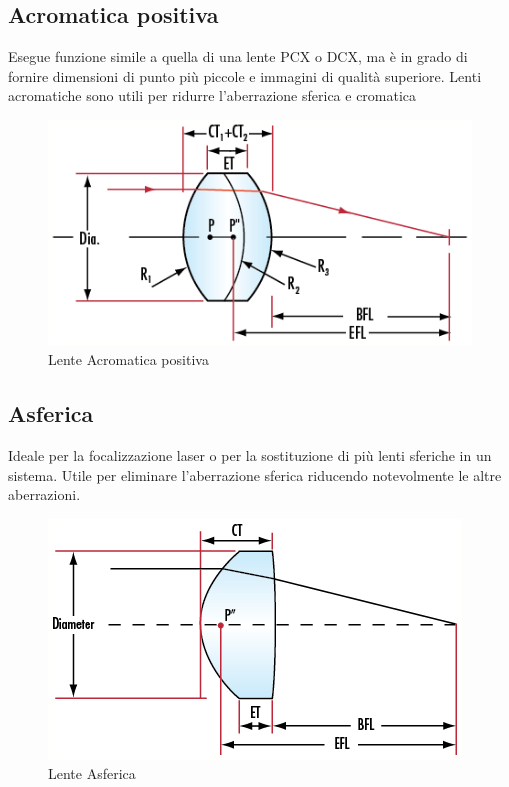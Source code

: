 \subsection{Acromatica positiva}
Esegue funzione simile a quella di una lente PCX o DCX, ma è in grado di fornire dimensioni di punto più piccole e immagini di qualità superiore. Lenti acromatiche sono utili per ridurre l'aberrazione sferica e cromatica
\begin{figure}[!ht]
\centering

\includegraphics[width=.3\textwidth]{img/positiva-acromatica.png}

\caption{Lente Acromatica positiva}
\label{fig:ccd-blockdiagram}
\end{figure}

\subsection{Asferica}
Ideale per la focalizzazione laser o per la sostituzione di più lenti sferiche in un sistema. Utile per eliminare l'aberrazione sferica  riducendo notevolmente le altre aberrazioni.

\begin{figure}[!ht]
\centering

\includegraphics[width=.3\textwidth]{img/asferica.png}

\caption{Lente Asferica}
\label{fig:ccd-blockdiagram}
\end{figure}



